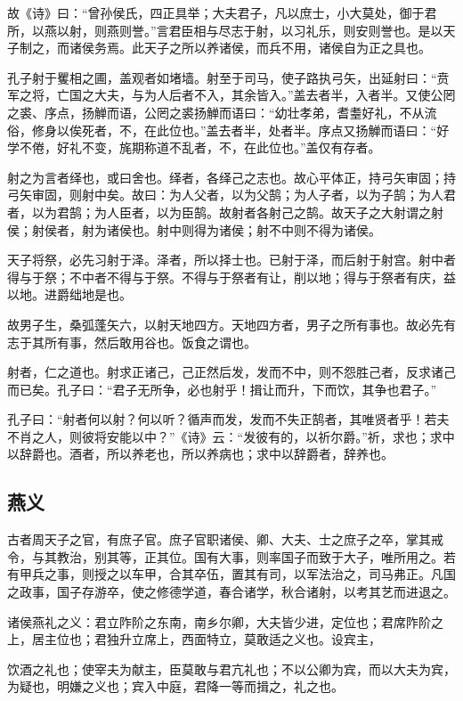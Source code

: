 \documentclass[]{article}
\begin{document}
故《诗》曰：``曾孙侯氏，四正具举；大夫君子，凡以庶士，小大莫处，御于君所，以燕以射，则燕则誉。''言君臣相与尽志于射，以习礼乐，则安则誉也。是以天子制之，而诸侯务焉。此天子之所以养诸侯，而兵不用，诸侯自为正之具也。

孔子射于矍相之圃，盖观者如堵墙。射至于司马，使子路执弓矢，出延射曰：``贲军之将，亡国之大夫，与为人后者不入，其余皆入。''盖去者半，入者半。又使公罔之裘、序点，扬觯而语，公罔之裘扬觯而语曰：``幼壮孝弟，耆耋好礼，不从流俗，修身以俟死者，不，在此位也。''盖去者半，处者半。序点又扬觯而语曰：``好学不倦，好礼不变，旄期称道不乱者，不，在此位也。''盖仅有存者。

射之为言者绎也，或曰舍也。绎者，各绎己之志也。故心平体正，持弓矢审固；持弓矢审固，则射中矣。故曰：为人父者，以为父鹄；为人子者，以为子鹄；为人君者，以为君鹄；为人臣者，以为臣鹄。故射者各射己之鹄。故天子之大射谓之射侯；射侯者，射为诸侯也。射中则得为诸侯；射不中则不得为诸侯。

天子将祭，必先习射于泽。泽者，所以择士也。已射于泽，而后射于射宫。射中者得与于祭；不中者不得与于祭。不得与于祭者有让，削以地；得与于祭者有庆，益以地。进爵绌地是也。

故男子生，桑弧蓬矢六，以射天地四方。天地四方者，男子之所有事也。故必先有志于其所有事，然后敢用谷也。饭食之谓也。

射者，仁之道也。射求正诸己，己正然后发，发而不中，则不怨胜己者，反求诸己而已矣。孔子曰：``君子无所争，必也射乎！揖让而升，下而饮，其争也君子。''

孔子曰：``射者何以射？何以听？循声而发，发而不失正鹄者，其唯贤者乎！若夫不肖之人，则彼将安能以中？''《诗》云：``发彼有的，以祈尔爵。''祈，求也；求中以辞爵也。酒者，所以养老也，所以养病也；求中以辞爵者，辞养也。

\hypertarget{header-n948}{%
\subsection{燕义}\label{header-n948}}

古者周天子之官，有庶子官。庶子官职诸侯、卿、大夫、士之庶子之卒，掌其戒令，与其教治，别其等，正其位。国有大事，则率国子而致于大子，唯所用之。若有甲兵之事，则授之以车甲，合其卒伍，置其有司，以军法治之，司马弗正。凡国之政事，国子存游卒，使之修德学道，春合诸学，秋合诸射，以考其艺而进退之。

诸侯燕礼之义：君立阼阶之东南，南乡尔卿，大夫皆少进，定位也；君席阼阶之上，居主位也；君独升立席上，西面特立，莫敢适之义也。设宾主，

饮酒之礼也；使宰夫为献主，臣莫敢与君亢礼也；不以公卿为宾，而以大夫为宾，为疑也，明嫌之义也；宾入中庭，君降一等而揖之，礼之也。
\end{document}
